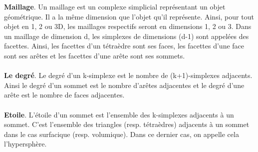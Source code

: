 \documentclass[a4paper,11pt,openany]{article}
\begin{document}
\textbf{Maillage}. Un maillage est un complexe simplicial représentant un objet géométrique. Il a la même dimension que l'objet qu'il représente. Ainsi, pour tout objet en 1, 2 ou 3D, les maillages respectifs seront en dimensions 1, 2 ou 3. Dans un maillage de dimension d, les simplexes de dimensions (d-1) sont appelées des facettes. Ainsi, les facettes d'un tétraèdre sont ses faces, les facettes d'une face sont ses arêtes et les facettes d'une arête sont ses sommets.\\\\
\textbf{Le degré}. Le degré d'un k-simplexe est le nombre de (k+1)-simplexes adjacents. Ainsi le degré d'un sommet est le nombre d'arêtes adjacentes et le degré d'une arête est le nombre de faces adjacentes.\\\\
\textbf{Etoile}. L'étoile d'un sommet est l'ensemble des k-simplexes adjacents à un sommet. C'est l'ensemble des triangles (resp. tétraèdres) adjacents à un sommet dans le cas surfacique (resp. volumique). Dans ce dernier cas, on appelle cela l'hypersphère.

\end{document}
